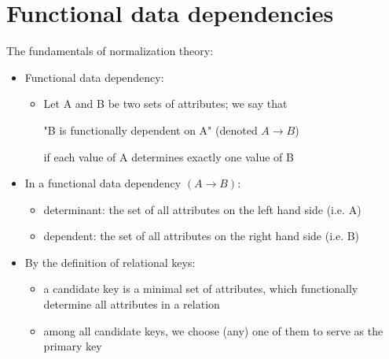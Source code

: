 \documentclass{article}[18pt]
\begin{document}
\section{Functional data dependencies}
The fundamentals of normalization theory:
\begin{itemize}
	\item Functional data dependency:
	\begin{itemize}
		\item Let A and B be two sets of attributes; we say that
		\begin{center}
			"B is functionally dependent on A" (denoted $A\rightarrow B$)
		\end{center}
		if each value of A determines exactly one value of B
	\end{itemize}
	\item In a functional data dependency $(A\rightarrow B)$:
	\begin{itemize}
		\item determinant: the set of all attributes on the left hand side (i.e. A)
		\item dependent: the set of all attributes on the right hand side (i.e. B)
	\end{itemize}
	\item By the definition of relational keys:
	\begin{itemize}
		\item a candidate key is a minimal set of attributes, which functionally determine all attributes in a relation
		\item among all candidate keys, we choose (any) one of them to serve as the primary key
	\end{itemize}
\end{itemize}
\end{document}
